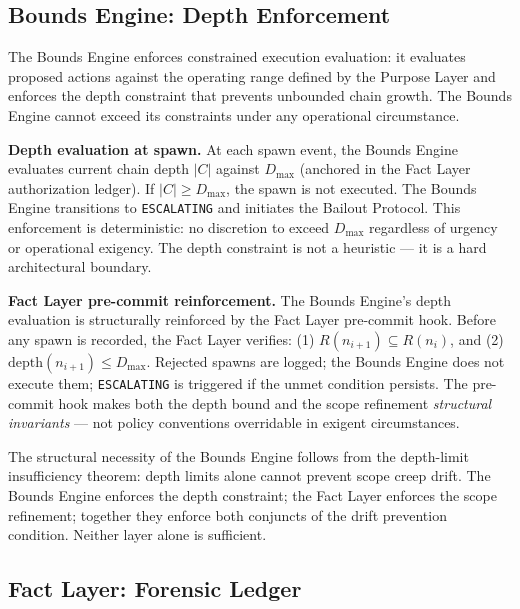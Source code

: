 \subsection{Bounds Engine: Depth Enforcement}
\label{sec:rs-bounds-depth}

The Bounds Engine enforces constrained execution evaluation: it evaluates proposed actions against the operating range defined by the Purpose Layer and enforces the depth constraint that prevents unbounded chain growth. The Bounds Engine cannot exceed its constraints under any operational circumstance.

\medskip
\noindent\textbf{Depth evaluation at spawn.} At each spawn event, the Bounds Engine evaluates current chain depth $|C|$ against $D_{\mathrm{max}}$ (anchored in the Fact Layer authorization ledger). If $|C| \geq D_{\mathrm{max}}$, the spawn is not executed. The Bounds Engine transitions to \texttt{ESCALATING} and initiates the Bailout Protocol. This enforcement is deterministic: no discretion to exceed $D_{\mathrm{max}}$ regardless of urgency or operational exigency. The depth constraint is not a heuristic — it is a hard architectural boundary.

\medskip
\noindent\textbf{Fact Layer pre-commit reinforcement.} The Bounds Engine's depth evaluation is structurally reinforced by the Fact Layer pre-commit hook. Before any spawn is recorded, the Fact Layer verifies: (1) $R(n_{i+1}) \subseteq R(n_i)$, and (2) $\mathrm{depth}(n_{i+1}) \leq D_{\mathrm{max}}$. Rejected spawns are logged; the Bounds Engine does not execute them; \texttt{ESCALATING} is triggered if the unmet condition persists. The pre-commit hook makes both the depth bound and the scope refinement \emph{structural invariants} — not policy conventions overridable in exigent circumstances.

The structural necessity of the Bounds Engine follows from the depth-limit insufficiency theorem: depth limits alone cannot prevent scope creep drift. The Bounds Engine enforces the depth constraint; the Fact Layer enforces the scope refinement; together they enforce both conjuncts of the drift prevention condition. Neither layer alone is sufficient.

\subsection{Fact Layer: Forensic Ledger}
\label{sec:rs-fact-ledger}

